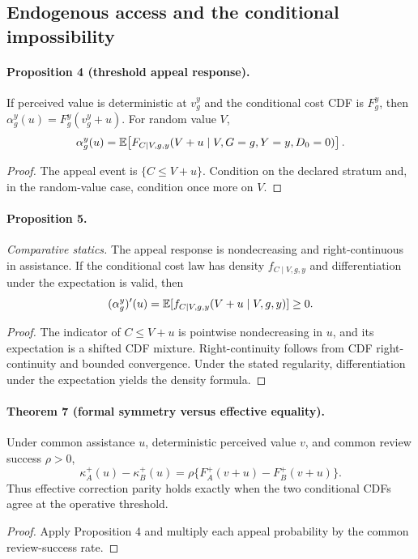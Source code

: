 \subsection{Endogenous access and the conditional impossibility}

\paragraph{Proposition 4 (threshold appeal response).}
If perceived value is deterministic at $v_g^y$ and the conditional cost CDF
is $F_g^y$, then $\alpha_g^y(u)=F_g^y(v_g^y+u)$.  For random value $V$,
\[
\alpha_g^y(u)=
\mathbb{E}\!\left[F_{C\mid V,g,y}(V+u\mid V,G=g,Y=y,D_0=0)\right].
\]

\begin{proof}
The appeal event is $\{C\le V+u\}$.  Condition on the declared stratum and,
in the random-value case, condition once more on $V$.
\end{proof}

\paragraph{Proposition 5.} \emph{Comparative statics.}
The appeal response is nondecreasing and right-continuous in assistance.  If
the conditional cost law has density $f_{C\mid V,g,y}$ and differentiation
under the expectation is valid, then
\[
(\alpha_g^y)'(u)=
\mathbb{E}[f_{C\mid V,g,y}(V+u\mid V,g,y)]\ge0.
\]

\begin{proof}
The indicator of $C\le V+u$ is pointwise nondecreasing in $u$, and its
expectation is a shifted CDF mixture.  Right-continuity follows from CDF
right-continuity and bounded convergence.  Under the stated regularity,
differentiation under the expectation yields the density formula.
\end{proof}

\paragraph{Theorem 7 (formal symmetry versus effective equality).}
Under common assistance $u$, deterministic perceived value $v$, and common
review success $\rho>0$,
\[
\kappa_A^+(u)-\kappa_B^+(u)
=\rho\{F_A^+(v+u)-F_B^+(v+u)\}.
\]
Thus effective correction parity holds exactly when the two conditional CDFs
agree at the operative threshold.

\begin{proof}
Apply Proposition 4 and multiply each appeal probability by the common
review-success rate.
\end{proof}

